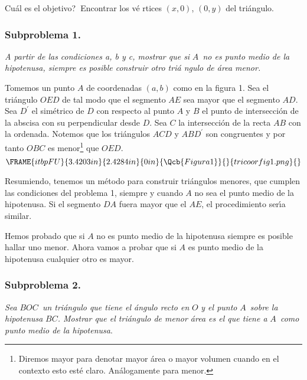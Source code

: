 \documentclass[a4paper,spanish]{article}
\begin{document}
\textquestiondown Cu\'{a}l es el objetivo?\textbf{\ }Encontrar los v\'{e}%
rtices $\left( x,0\right) $, $\left( 0,y\right) $ del tri\'{a}ngulo.

\subsubsection{Subproblema 1.}

\emph{A partir de las condiciones a, b y c, mostrar que si }$A$\emph{\ no es
punto medio de la hipotenusa, siempre es posible construir otro tri\'{a}%
ngulo de \'{a}rea menor.}

Tomemos un punto $A$ de coordenadas $\left( a,b\right) $ como en la figura
1. Sea el tri\'{a}ngulo $OED$ de tal modo que el segmento $AE$ sea mayor que
el segmento $AD$. Sea $D^{\prime }$ el sim\'{e}trico de $D$ con respecto al
punto $A$ y $B$ el punto de intersecci\'{o}n de la abscisa con su
perpendicular desde $D$. Sea $C$ la intersecci\'{o}n de la recta $AB$ con la
ordenada. Notemos que los tri\'{a}ngulos $ACD$ y $ABD^{\prime }$ son
congruentes y por tanto $OBC$ es menor\footnote{%
Diremos mayor para denotar mayor \'{a}rea o mayor volumen cuando en el
contexto esto est\'{e} claro. An\'{a}logamente para menor.} que $OED$.%
\[
\FRAME{itbpFU}{3.4203in}{2.4284in}{0in}{\Qcb{Figura 1}}{}{tricoorfig1.png}{%
\special{language "Scientific Word";type "GRAPHIC";maintain-aspect-ratio
TRUE;display "USEDEF";valid_file "F";width 3.4203in;height 2.4284in;depth
0in;original-width 4.0785in;original-height 2.8876in;cropleft "0";croptop
"1";cropright "1";cropbottom "0";filename
'F:/Optimizacion/TriCoorFig1.PNG';file-properties "XNPEU";}} 
\]

Resumiendo, tenemos un m\'{e}todo para construir tri\'{a}ngulos menores, que
cumplen las condiciones del problema 1, siempre y cuando $A$ no sea el punto
medio de la hipotenusa. Si el segmento $DA$ fuera mayor que el $AE$, el
procedimiento ser\'{\i}a similar.

Hemos probado que si $A$ no es punto medio de la hipotenusa siempre es
posible hallar uno menor. Ahora vamos a probar que si $A$ es punto medio de
la hipotenusa cualquier otro es mayor.

\subsubsection{Subproblema 2.}

\emph{Sea }$BOC$\emph{\ un tri\'{a}ngulo que tiene el \'{a}ngulo recto en }$%
O $ \emph{y el punto }$A$\emph{\ sobre la hipotenusa }$BC$\emph{. Mostrar
que el tri\'{a}ngulo de menor \'{a}rea es el que tiene a }$A$\emph{\ como
punto medio de la hipotenusa}$.$
\end{document}

